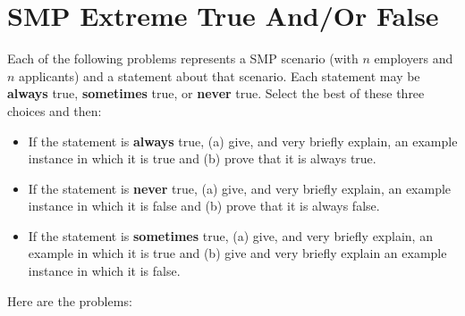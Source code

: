 \section{SMP Extreme True And/Or False}

Each of the following problems represents a SMP scenario (with $n$ employers and $n$ applicants) and a statement about that scenario. Each statement may be \textbf{always} true, \textbf{sometimes} true, or \textbf{never} true. Select the best of these three choices and then:
\begin{itemize}
	\item If the statement is \textbf{always} true, (a) give, and very briefly explain, an example instance in which it is true and (b) prove that it is always true.
	\item If the statement is \textbf{never} true, (a) give, and very briefly explain, an example instance in which it is false and (b) prove that it is always false.
	\item If the statement is \textbf{sometimes} true, (a) give, and very briefly explain, an example in which it is true and (b) give and very briefly explain an example instance in which it is false.
\end{itemize}
Here are the problems:

